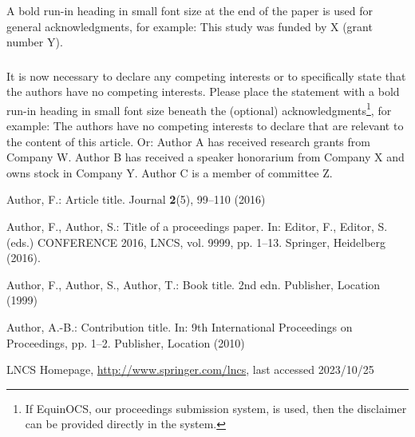 \documentclass[runningheads]{llncs}
\begin{document}
\begin{credits}
\subsubsection{\ackname} A bold run-in heading in small font size at the end of the paper is
used for general acknowledgments, for example: This study was funded
by X (grant number Y).

\subsubsection{\discintname}
It is now necessary to declare any competing interests or to specifically
state that the authors have no competing interests. Please place the
statement with a bold run-in heading in small font size beneath the
(optional) acknowledgments\footnote{If EquinOCS, our proceedings submission
system, is used, then the disclaimer can be provided directly in the system.},
for example: The authors have no competing interests to declare that are
relevant to the content of this article. Or: Author A has received research
grants from Company W. Author B has received a speaker honorarium from
Company X and owns stock in Company Y. Author C is a member of committee Z.
\end{credits}
%
%
%
% 
% 
%
\begin{thebibliography}{8}
Author, F.: Article title. Journal \textbf{2}(5), 99--110 (2016)

Author, F., Author, S.: Title of a proceedings paper. In: Editor,
F., Editor, S. (eds.) CONFERENCE 2016, LNCS, vol. 9999, pp. 1--13.
Springer, Heidelberg (2016). 

Author, F., Author, S., Author, T.: Book title. 2nd edn. Publisher,
Location (1999)

Author, A.-B.: Contribution title. In: 9th International Proceedings
on Proceedings, pp. 1--2. Publisher, Location (2010)

LNCS Homepage, \url{http://www.springer.com/lncs}, last accessed 2023/10/25
\end{thebibliography}
\end{document}
